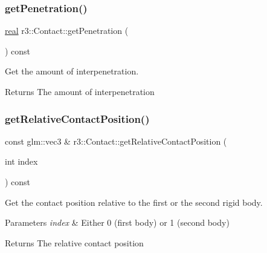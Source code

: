 \subsubsection{\texorpdfstring{get\+Penetration()}{getPenetration()}}
{\footnotesize\ttfamily \mbox{\hyperlink{namespacer3_ab2016b3e3f743fb735afce242f0dc1eb}{real}} r3\+::\+Contact\+::get\+Penetration (\begin{DoxyParamCaption}{ }\end{DoxyParamCaption}) const}



Get the amount of interpenetration. 

\begin{DoxyReturn}{Returns}
The amount of interpenetration 
\end{DoxyReturn}
\mbox{\label{classr3_1_1_contact_ade5794f7055fb30ff52f9193b92c6bf0}} 
\subsubsection{\texorpdfstring{get\+Relative\+Contact\+Position()}{getRelativeContactPosition()}}
{\footnotesize\ttfamily const glm\+::vec3 \& r3\+::\+Contact\+::get\+Relative\+Contact\+Position (\begin{DoxyParamCaption}\item[{int}]{index }\end{DoxyParamCaption}) const}



Get the contact position relative to the first or the second rigid body. 


\begin{DoxyParams}{Parameters}
{\em index} & Either 0 (first body) or 1 (second body) \\
\hline
\end{DoxyParams}
\begin{DoxyReturn}{Returns}
The relative contact position 
\end{DoxyReturn}
\mbox{\label{classr3_1_1_contact_a8ec701dcaf82e7fc65bc6c4a2cb6987e}} 
